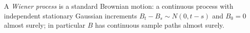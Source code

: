 
A \emph{Wiener process} is a standard Brownian motion: a continuous process with independent stationary Gaussian increments $B_t-B_s\sim N(0,t-s)$ and $B_0=0$ almost surely; in particular $B$ has continuous sample paths almost surely.
